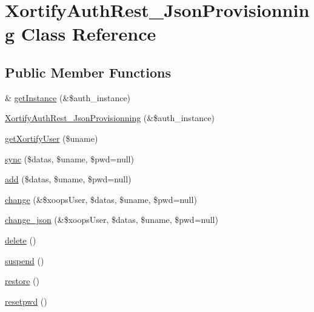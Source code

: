 \hypertarget{class_xortify_auth_rest___json_provisionning}{\section{Xortify\-Auth\-Rest\-\_\-\-Json\-Provisionning Class Reference}
\label{class_xortify_auth_rest___json_provisionning}
}
\subsection*{Public Member Functions}
\begin{DoxyCompactItemize}
\item 
\& \hyperlink{class_xortify_auth_rest___json_provisionning_a2c8eaa915c70d75289ac8a03686194f9}{get\-Instance} (\&\$auth\-\_\-instance)
\item 
\hyperlink{class_xortify_auth_rest___json_provisionning_a03e64738687ab1fe682d5ab476372acd}{Xortify\-Auth\-Rest\-\_\-\-Json\-Provisionning} (\&\$auth\-\_\-instance)
\item 
\hyperlink{class_xortify_auth_rest___json_provisionning_a041d726ac26672547ed1504e8e0117aa}{get\-Xortify\-User} (\$uname)
\item 
\hyperlink{class_xortify_auth_rest___json_provisionning_a35dc08b0f2138eb818ff95345b73bcff}{sync} (\$datas, \$uname, \$pwd=null)
\item 
\hyperlink{class_xortify_auth_rest___json_provisionning_adfc9fcef01e7bd7b2f47e8e79d51fc63}{add} (\$datas, \$uname, \$pwd=null)
\item 
\hyperlink{class_xortify_auth_rest___json_provisionning_ae1f0971b9712c794620cf309164e43af}{change} (\&\$xoops\-User, \$datas, \$uname, \$pwd=null)
\item 
\hyperlink{class_xortify_auth_rest___json_provisionning_a94f4e0408f26e65abca347ec883f4ec9}{change\-\_\-json} (\&\$xoops\-User, \$datas, \$uname, \$pwd=null)
\item 
\hyperlink{class_xortify_auth_rest___json_provisionning_a13bdffdd926f26b825ea57066334ff01}{delete} ()
\item 
\hyperlink{class_xortify_auth_rest___json_provisionning_ad73006a505121228f3b075c2409787d2}{suspend} ()
\item 
\hyperlink{class_xortify_auth_rest___json_provisionning_aa1371f22826cf8cde4454c9b467203d0}{restore} ()
\item 
\hyperlink{class_xortify_auth_rest___json_provisionning_a06d70fbd3a2db390b6f2530c0076628e}{resetpwd} ()
\end{DoxyCompactItemize}
